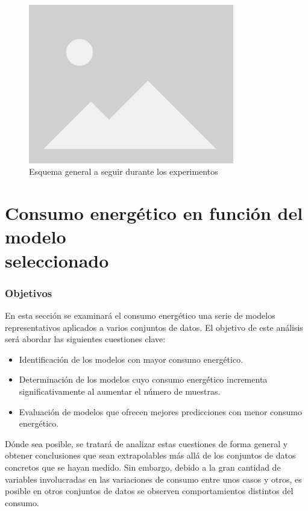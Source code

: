 \begin{figure}[H]
  \centerline{
     \includegraphics[width=0.8\textwidth, keepaspectratio]{img/placeholder.png}
  }
  \caption{Esquema general a seguir durante los experimentos}
  \label{fig:esquema-experimentos}
\end{figure}

\section{Consumo energético en función del modelo\\ seleccionado}
\label{sec:test-1-models}

\subsubsection{Objetivos}

En esta sección se examinará el consumo energético una serie de modelos representativos aplicados a varios conjuntos de datos. El objetivo de este análisis será abordar las siguientes cuestiones clave:

\begin{itemize}
    \item Identificación de los modelos con mayor consumo energético.
    \item Determinación de los modelos cuyo consumo energético incrementa significativamente al aumentar el número de muestras.
    \item Evaluación de modelos que ofrecen mejores predicciones con menor consumo energético.
\end{itemize}

Dónde sea posible, se tratará de analizar estas cuestiones de forma general y obtener conclusiones que sean extrapolables más allá de los conjuntos de datos concretos que se hayan medido. Sin embargo, debido a la gran cantidad de variables involucradas en las variaciones de consumo entre unos casos y otros, es posible en otros conjuntos de datos se observen comportamientos distintos del consumo.

